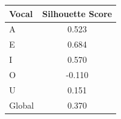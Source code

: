 \begin{tabular}{lc}
\toprule
\rowcolor{col01}
Vocal & Silhouette Score \\
\midrule
A & 0.523 \\
E & 0.684 \\
I & 0.570 \\
O & -0.110 \\
U & 0.151 \\
Global & 0.370 \\
\bottomrule
\end{tabular}

